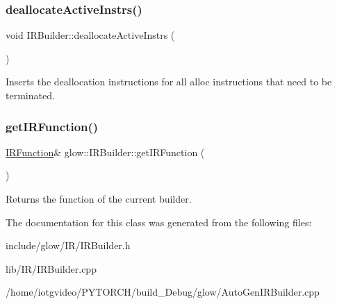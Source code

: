 \subsubsection{\texorpdfstring{deallocate\+Active\+Instrs()}{deallocateActiveInstrs()}}
{\footnotesize\ttfamily void I\+R\+Builder\+::deallocate\+Active\+Instrs (\begin{DoxyParamCaption}{ }\end{DoxyParamCaption})}

Inserts the deallocation instructions for all \textquotesingle{}alloc\textquotesingle{} instructions that need to be terminated. \mbox{\label{classglow_1_1_i_r_builder_ad641d03c18c361fbf0f13ba844aa53d1}} 
\subsubsection{\texorpdfstring{get\+I\+R\+Function()}{getIRFunction()}}
{\footnotesize\ttfamily \hyperlink{classglow_1_1_i_r_function}{I\+R\+Function}\& glow\+::\+I\+R\+Builder\+::get\+I\+R\+Function (\begin{DoxyParamCaption}{ }\end{DoxyParamCaption})\hspace{0.3cm}{\ttfamily [inline]}}

\begin{DoxyReturn}{Returns}
the function of the current builder. 
\end{DoxyReturn}


The documentation for this class was generated from the following files\+:\begin{DoxyCompactItemize}
\item 
include/glow/\+I\+R/I\+R\+Builder.\+h\item 
lib/\+I\+R/I\+R\+Builder.\+cpp\item 
/home/iotgvideo/\+P\+Y\+T\+O\+R\+C\+H/build\+\_\+\+Debug/glow/Auto\+Gen\+I\+R\+Builder.\+cpp\end{DoxyCompactItemize}
